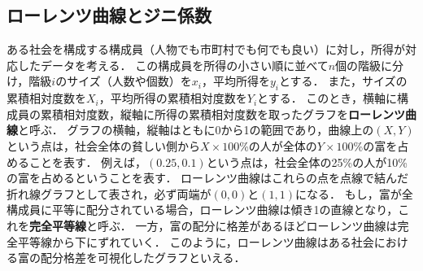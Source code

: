 %
%
%

\subsection{ローレンツ曲線とジニ係数}
%
%
ある社会を構成する構成員（人物でも市町村でも何でも良い）に対し，所得が対応したデータを考える．
%
この構成員を所得の小さい順に並べて$ n $個の階級に分け，階級$ i $のサイズ（人数や個数）を$ x_{i} $，平均所得を$ y_{i} $とする．
%
また，サイズの累積相対度数を$ X_{i} $，平均所得の累積相対度数を$ Y_{i} $とする．
%
このとき，横軸に構成員の累積相対度数，縦軸に所得の累積相対度数を取ったグラフを\textbf{ローレンツ曲線}と呼ぶ．
%
グラフの横軸，縦軸はともに0から1の範囲であり，曲線上の$ (X, Y) $という点は，社会全体の貧しい側から$ X\times100 $\%の人が全体の$ Y\times100 $\%の富を占めることを表す．
%
例えば，$ (0.25, 0.1) $という点は，社会全体の25\%の人が10\%の富を占めるということを表す．
%
ローレンツ曲線はこれらの点を点線で結んだ折れ線グラフとして表され，必ず両端が$ (0, 0) $と$ (1, 1) $になる．
%
もし，富が全構成員に平等に配分されている場合，ローレンツ曲線は傾き1の直線となり，これを\textbf{完全平等線}と呼ぶ．
%
一方，富の配分に格差があるほどローレンツ曲線は完全平等線から下にずれていく．
%
このように，ローレンツ曲線はある社会における富の配分格差を可視化したグラフといえる．
%

